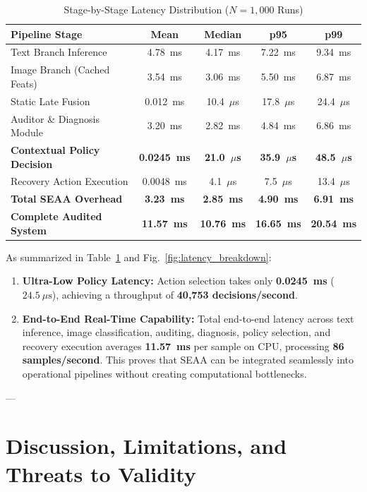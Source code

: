 \documentclass[journal]{IEEEtran}
\begin{document}
\begin{table}[h]
\centering
\caption{Stage-by-Stage Latency Distribution ($N=1,000$ Runs)}
\label{tab:latency_metrics}
\begin{tabular}{lcccc}
\toprule
\textbf{Pipeline Stage} & \textbf{Mean} & \textbf{Median} & \textbf{p95} & \textbf{p99} \\
\midrule
Text Branch Inference & 4.78~ms & 4.17~ms & 7.22~ms & 9.34~ms \\
Image Branch (Cached Feats) & 3.54~ms & 3.06~ms & 5.50~ms & 6.87~ms \\
Static Late Fusion & 0.012~ms & 10.4~$\mu$s & 17.8~$\mu$s & 24.4~$\mu$s \\
Auditor \& Diagnosis Module & 3.20~ms & 2.82~ms & 4.84~ms & 6.86~ms \\
\textbf{Contextual Policy Decision} & \textbf{0.0245~ms} & \textbf{21.0~$\mu$s} & \textbf{35.9~$\mu$s} & \textbf{48.5~$\mu$s} \\
Recovery Action Execution & 0.0048~ms & 4.1~$\mu$s & 7.5~$\mu$s & 13.4~$\mu$s \\
\midrule
\textbf{Total SEAA Overhead} & \textbf{3.23~ms} & \textbf{2.85~ms} & \textbf{4.90~ms} & \textbf{6.91~ms} \\
\textbf{Complete Audited System} & \textbf{11.57~ms} & \textbf{10.76~ms} & \textbf{16.65~ms} & \textbf{20.54~ms} \\
\bottomrule
\end{tabular}
\end{table}

As summarized in Table~\ref{tab:latency_metrics} and Fig.~\ref{fig:latency_breakdown}:
\begin{enumerate}
    \item \textbf{Ultra-Low Policy Latency:} Action selection takes only \textbf{0.0245~ms} ($24.5~\mu\text{s}$), achieving a throughput of \textbf{40,753 decisions/second}.
    \item \textbf{End-to-End Real-Time Capability:} Total end-to-end latency across text inference, image classification, auditing, diagnosis, policy selection, and recovery execution averages \textbf{11.57~ms} per sample on CPU, processing \textbf{86 samples/second}. This proves that SEAA can be integrated seamlessly into operational pipelines without creating computational bottlenecks.
\end{enumerate}

---

\section{Discussion, Limitations, and Threats to Validity}
\end{document}
